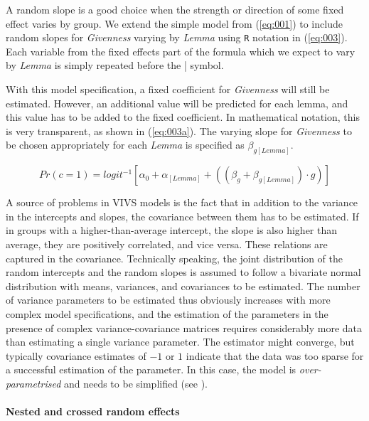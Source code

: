 A random slope is a good choice when the strength or direction of some fixed effect varies by group.
We extend the simple model from (\ref{eq:001}) to include random slopes for \textit{Givenness} varying by \textit{Lemma} using \texttt{R} notation in (\ref{eq:003}).
Each variable from the fixed effects part of the formula which we expect to vary by \textit{Lemma} is simply repeated before the | symbol.


With this model specification, a fixed coefficient for \textit{Givenness} will still be estimated.
However, an additional value will be predicted for each lemma, and this value has to be added to the fixed coefficient.
In mathematical notation, this is very transparent, as shown in (\ref{eq:003a}).
The varying slope for \textit{Givenness} to be chosen appropriately for each \textit{Lemma} is specified as $\beta_{g[Lemma]}$.

\begin{equation}
  Pr(c=1)=logit^{-1}\left[\alpha_0+\alpha_{[Lemma]}+((\beta_{g}+\beta_{g[Lemma]}) \cdot g)\right]
  \label{eq:003a}
\end{equation}

A source of problems in VIVS models is the fact that in addition to the variance in the intercepts and slopes, the covariance between them has to be estimated.
If in groups with a higher-than-average intercept, the slope is also higher than average, they are positively correlated, and vice versa.
These relations are captured in the covariance.
Technically speaking, the joint distribution of the random intercepts and the random slopes is assumed to follow a bivariate normal distribution with means, variances, and covariances to be estimated.
The number of variance parameters to be estimated thus obviously increases with more complex model specifications, and the estimation of the parameters in the presence of complex variance-covariance matrices requires considerably more data than estimating a single variance parameter.
The estimator might converge, but typically covariance estimates of $-1$ or $1$ indicate that the data was too sparse for a successful estimation of the parameter.
In this case, the model is \textit{over-parametrised} and needs to be simplified (see \citealt{BatesEa2015a,MatuschekEa2017}).

\paragraph{Nested and crossed random effects}

